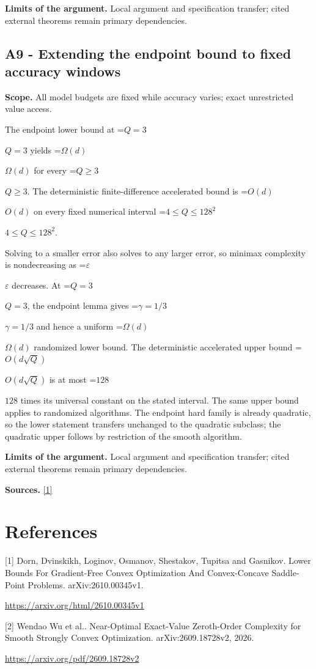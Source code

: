 \documentclass[10pt,a4paper]{article}
\newcommand{\AtlasMath}[1]{\par\begingroup\centering\setbox0=\hbox{$\displaystyle #1$}\ifdim\wd0>1.4\linewidth\typeout{ATLAS WIDE FORMULA: \the\wd0}\fi\ifdim\wd0>\linewidth\resizebox{\linewidth}{!}{\box0}\else\box0\fi\par\endgroup}
\newcommand{\AtlasInlineMath}[1]{\begingroup\setbox0=\hbox{$#1$}\ifdim\wd0>.4\linewidth\endgroup\AtlasMath{#1}\else\endgroup$#1$\fi}
\begin{document}
\textbf{Limits of the argument.} Local argument and specification transfer; cited external theorems remain primary dependencies.

\subsection{A9 - Extending the endpoint bound to fixed accuracy windows}
\textbf{Scope.} All model budgets are fixed while accuracy varies; exact unrestricted value access.

The endpoint lower bound at \AtlasInlineMath{Q=3} yields \AtlasInlineMath{\Omega(d)} for every \AtlasInlineMath{Q\ge3}. The deterministic finite-difference accelerated bound is \AtlasInlineMath{O(d)} on every fixed numerical interval \AtlasInlineMath{4\le Q\le128^2}.

Solving to a smaller error also solves to any larger error, so minimax complexity is nondecreasing as \AtlasInlineMath{\varepsilon} decreases. At \AtlasInlineMath{Q=3}, the endpoint lemma gives \AtlasInlineMath{\gamma=1/3} and hence a uniform \AtlasInlineMath{\Omega(d)} randomized lower bound. The deterministic accelerated upper bound \AtlasInlineMath{O(d\sqrt Q)} is at most \AtlasInlineMath{128} times its universal constant on the stated interval. The same upper bound applies to randomized algorithms. The endpoint hard family is already quadratic, so the lower statement transfers unchanged to the quadratic subclass; the quadratic upper follows by restriction of the smooth algorithm.

\textbf{Limits of the argument.} Local argument and specification transfer; cited external theorems remain primary dependencies.

\textbf{Sources.} \href{https://arxiv.org/html/2610.00345v1}{[1]}

\section{References}
[1] Dorn, Dvinskikh, Loginov, Osmanov, Shestakov, Tupitsa and Gasnikov. Lower Bounds For Gradient-Free Convex Optimization And Convex-Concave Saddle-Point Problems. arXiv:2610.00345v1.

\url{https://arxiv.org/html/2610.00345v1}

[2] Wendao Wu et al.. Near-Optimal Exact-Value Zeroth-Order Complexity for Smooth Strongly Convex Optimization. arXiv:2609.18728v2, 2026.

\url{https://arxiv.org/pdf/2609.18728v2}
\end{document}
